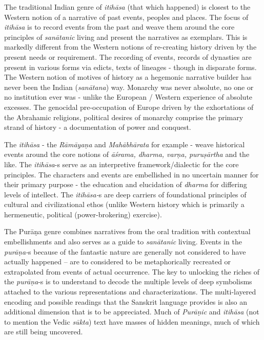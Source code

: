 The traditional Indian genre of \textit{itihāsa} (that which happened) is closest to the Western notion of a narrative of past events, peoples and places. The focus of \textit{itihāsa} is to record events from the past and weave them around the core principles of \textit{sanātanic} living and present the narratives as exemplars. This is markedly different from the Western notions of re-creating history driven by the present needs or requirement. The recording of events, records of dynasties are present in various forms via edicts, texts of lineages - though in disparate forms. The Western notion of motives of history as a hegemonic narrative builder has never been the Indian (\textit{sanātana}) way. Monarchy was never absolute, no one or no institution ever was - unlike the European / Western experience of absolute excesses. The genocidal pre-occupation of Europe driven by the exhortations of the Abrahamic religions, political desires of monarchy comprise the primary strand of history - a documentation of power and conquest.

The \textit{itihāsa} - the \textit{Rāmāyaṇa} and \textit{Mahābhārata} for example - weave historical events around the core notions of \textit{āśrama, dharma, varṇa, puruṣārtha} and the like. The \textit{itihāsa}-s serve as an interpretive framework/dialectic for the core principles. The characters and events are embellished in no uncertain manner for their primary purpose - the education and elucidation of \textit{dharma} for differing levels of intellect. The \textit{itihāsa-}s are deep carriers of foundational principles of cultural and civilizational ethos (unlike Western history which is primarily a hermeneutic, political (power-brokering) exercise).

The Purāṇa genre combines narratives from the oral tradition with contextual embellishments and also serves as a guide to \textit{sanātanic} living. Events in the \textit{purāṇa-}s because of the fantastic nature are generally not considered to have actually happened – are to considered to be metaphorically recreated or extrapolated from events of actual occurrence. The key to unlocking the riches of the \textit{purāṇa}-s is to understand to decode the multiple levels of deep symbolisms attached to the various representations and characterizations. The multi-layered encoding and possible readings that the Sanskrit language provides is also an additional dimension that is to be appreciated. Much of \textit{Purāṇic} and \textit{itihāsa} (not to mention the Vedic \textit{sūkta}) text have masses of hidden meanings, much of which are still being uncovered.


